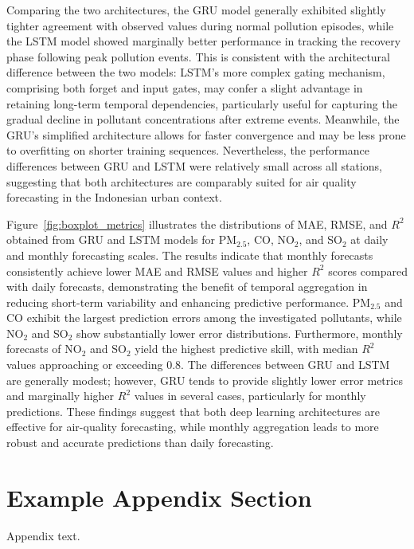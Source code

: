 \documentclass[review,12pt]{elsarticle}
\begin{document}
Comparing the two architectures, the GRU model generally exhibited slightly tighter agreement with observed values during normal pollution episodes, while the LSTM model showed marginally better performance in tracking the recovery phase following peak pollution events. This is consistent with the architectural difference between the two models: LSTM's more complex gating mechanism, comprising both forget and input gates, may confer a slight advantage in retaining long-term temporal dependencies, particularly useful for capturing the gradual decline in pollutant concentrations after extreme events. Meanwhile, the GRU's simplified architecture allows for faster convergence and may be less prone to overfitting on shorter training sequences. Nevertheless, the performance differences between GRU and LSTM were relatively small across all stations, suggesting that both architectures are comparably suited for air quality forecasting in the Indonesian urban context.


Figure~\ref{fig:boxplot_metrics} illustrates the distributions of MAE, RMSE, and $R^2$ obtained from GRU and LSTM models for PM$_{2.5}$, CO, NO$_2$, and SO$_2$ at daily and monthly forecasting scales. The results indicate that monthly forecasts consistently achieve lower MAE and RMSE values and higher $R^2$ scores compared with daily forecasts, demonstrating the benefit of temporal aggregation in reducing short-term variability and enhancing predictive performance. PM$_{2.5}$ and CO exhibit the largest prediction errors among the investigated pollutants, while NO$_2$ and SO$_2$ show substantially lower error distributions. Furthermore, monthly forecasts of NO$_2$ and SO$_2$ yield the highest predictive skill, with median $R^2$ values approaching or exceeding 0.8. The differences between GRU and LSTM are generally modest; however, GRU tends to provide slightly lower error metrics and marginally higher $R^2$ values in several cases, particularly for monthly predictions. These findings suggest that both deep learning architectures are effective for air-quality forecasting, while monthly aggregation leads to more robust and accurate predictions than daily forecasting.


\appendix
\section{Example Appendix Section}
\label{app1}

Appendix text.








\end{document}
